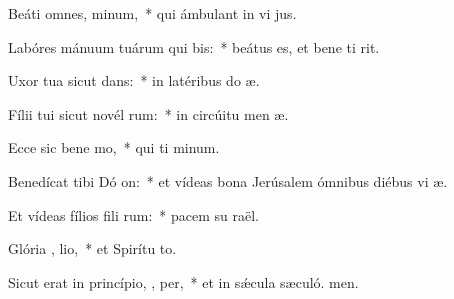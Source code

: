 \item Beáti omnes,   minum,~* qui ámbulant in vi jus.
\item Labóres mánuum tuárum qui bis:~* beátus es, et bene ti rit.
\item Uxor tua sicut  dans:~* in latéribus do æ.
\item Fílii tui sicut novél rum:~* in circúitu men æ.
\item Ecce sic bene mo,~* qui ti minum.
\item Benedícat tibi Dó  on:~* et vídeas bona Jerúsalem ómnibus diébus vi æ.
\item Et vídeas fílios fili rum:~* pacem su raël.
\item Glória ,  lio,~* et Spirítu to.
\item Sicut erat in princípio,  ,  per,~* et in sǽcula sæculó. men.
